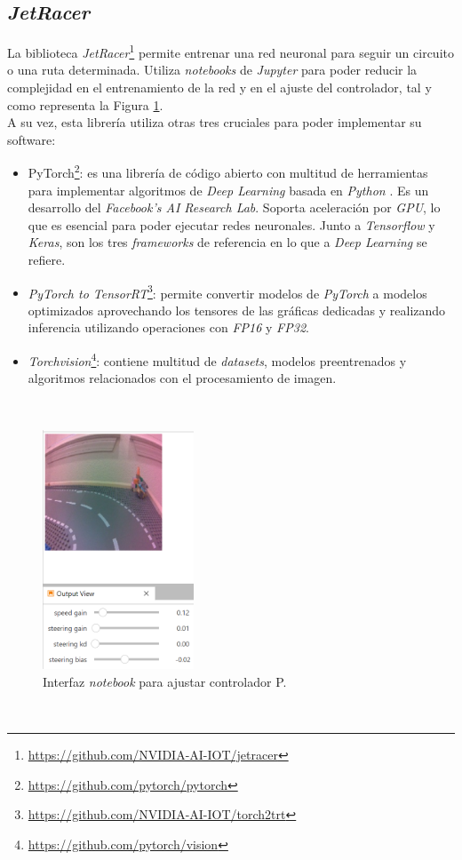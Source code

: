 \subsection{\textit{JetRacer}}
\label{subsection:jetracer}
La biblioteca \textit{JetRacer}\footnote{\url{https://github.com/NVIDIA-AI-IOT/jetracer}} permite entrenar una red neuronal para seguir un circuito o una ruta determinada. Utiliza \textit{notebooks} de \textit{Jupyter} para poder reducir la complejidad en el entrenamiento de la red y en el ajuste del controlador, tal y como representa la Figura \ref{fig:livejetracer}.\\
A su vez, esta librería utiliza otras tres cruciales para poder implementar su software:
\begin{itemize}
	\item PyTorch\footnote{\url{https://github.com/pytorch/pytorch}}: es una librería de código abierto con multitud de herramientas para implementar algoritmos de \textit{Deep Learning} basada en \textit{Python} \cite{autopilottesla}. Es un desarrollo del \textit{Facebook's AI Research Lab}. Soporta aceleración por \textit{GPU}, lo que es esencial para poder ejecutar redes neuronales. Junto a \textit{Tensorflow} y \textit{Keras}, son los tres \textit{frameworks} de referencia en lo que a \textit{Deep Learning} se refiere.
	\item \textit{PyTorch to TensorRT}\footnote{\url{https://github.com/NVIDIA-AI-IOT/torch2trt}}: permite convertir modelos de \textit{PyTorch} a modelos optimizados aprovechando los tensores de las gráficas dedicadas y realizando inferencia utilizando operaciones con \textit{FP16} y \textit{FP32}.
	\item \textit{Torchvision}\footnote{\url{https://github.com/pytorch/vision}}: contiene multitud de \textit{datasets}, modelos preentrenados y algoritmos relacionados con el procesamiento de imagen.
\end{itemize}\
\begin{figure} [h!]
	\begin{center}
		\includegraphics[width=4.5cm]{figs/livejetracer}
	\end{center}
	\caption{Interfaz \textit{notebook} para ajustar controlador P.}
	\label{fig:livejetracer}
\end{figure}\
